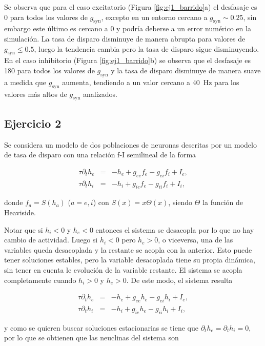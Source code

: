 \documentclass[11pt, twocolumn]{article}
\begin{document}
Se observa que para el caso excitatorio (Figura \ref{fig:ej1_barrido}a) el desfasaje es 0 para todos los valores de \(g_\text{syn}\), excepto en un entorno cercano a \(g_\text{syn} \sim 0.25\), sin embargo este último es cercano a 0 y podría deberse a un error numérico en la simulación. La tasa de disparo disminuye de manera abrupta para valores de \(g_\text{syn} \leq 0.5\), luego la tendencia cambia pero la tasa de disparo sigue disminuyendo. En el caso inhibitorio (Figura \ref{fig:ej1_barrido}b) se observa que el desfasaje es 180 para todos los valores de \(g_\text{syn}\) y la tasa de disparo disminuye de manera suave a medida que \(g_\text{syn}\) aumenta, tendiendo a un valor cercano a \SI{40}{\hertz} para los valores más altos de \(g_\text{syn}\) analizados.


\subsection*{Ejercicio 2}
Se considera un modelo de dos poblaciones de neuronas descritas por un modelo de tasa de disparo con una relación f-I semilineal de la forma 

\begin{eqnarray*}
    \tau \partial_t h_e  &=& -h_e + g_{ee} f_e - g_{ei} f_i + I_e, \\
    \tau \partial_t h_i  &=& -h_i + g_{ie} f_e - g_{ii} f_i + I_i,
\end{eqnarray*}

\noindent donde \(f_a = S(h_a)\) (\(a = e, i\)) con \(S(x) = x \Theta(x)\), siendo \(\Theta\) la función de Heaviside. 

Notar que si \(h_i < 0\) y \(h_e < 0\) entonces el sistema se desacopla por lo que no hay cambio de actividad. Luego si \(h_i < 0\) pero \(h_e > 0\), o viceversa, una de las variables queda desacoplada y la restante se acopla con la anterior. Esto puede tener soluciones estables, pero la variable desacoplada tiene su propia dinámica, sin tener en cuenta le evolución de la variable restante. El sistema se acopla completamente cuando \(h_i > 0\) y \(h_e > 0\). De este modo, el sistema resulta

\begin{eqnarray*}
    \tau \partial_t h_e  &=& -h_e + g_{ee} h_e - g_{ei} h_i + I_e, \\
    \tau \partial_t h_i  &=& -h_i + g_{ie} h_e - g_{ii} h_i + I_i,
\end{eqnarray*}

\noindent y como se quieren buscar soluciones estacionarias se tiene que \(\partial_t h_e = \partial_t h_i = 0\), por lo que se obtienen que las neuclinas del sistema son
\end{document}
